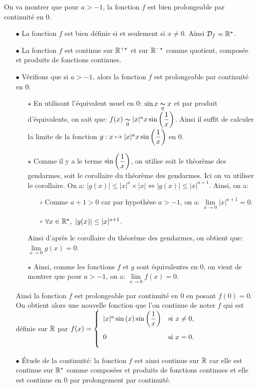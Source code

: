 \documentclass[a4paper, 11pt,reqno]{article}
\begin{document}
\begin{correction}   \;
	On va montrer que pour $a>-1$, la fonction $f$ est bien prolongeable par continuit\'e en 0.
	\begin{itemize}
		\item[$\bullet$] La fonction $f$ est bien d\'efinie si et seulement si $x\not= 0$. Ainsi $\mathcal{D}_f=\mathbb{R}^{\star}$.
		\item[$\bullet$] La fonction $f$ est continue sur $\mathbb{R}^{+\star}$ et sur $\mathbb{R}^{-\star}$ comme quotient, compos\'ee et produits de fonctions continues.
		\item[$\bullet$] V\'erifions que si $a>-1$, alors la fonction $f$ est prolongeable par continuit\'e en 0:
		      \begin{itemize}
			      \item[$\star$] En utilisant l'\'equivalent usuel en 0: $\sin{x}\underset{0}{\thicksim}x$ et par produit d'\'equivalents, on sait que: $f(x)\underset{0}{\thicksim} |x|^{a} x\sin{\left( \displaystyle\frac{1}{x}\right)}$. Ainsi il suffit de calculer la limite de la fonction $g: x\mapsto |x|^{a} x\sin{\left( \displaystyle\frac{1}{x}\right)}$ en 0.
			      \item[$\star$] Comme il y a le terme $\sin{\left( \displaystyle\frac{1}{x}\right)}$, on utilise soit le th\'eor\`{e}me des gendarmes, soit le corollaire du th\'eor\`{e}me des gendarmes. Ici on va utiliser le corollaire. On a:
			            $\left| g(x) \right|\leq |x|^{a}\times |x|\Leftrightarrow \left| g(x) \right|\leq |x|^{a+1}$. Ainsi, on a:
			            \begin{itemize}
				            \item[$\circ$] Comme $a+1>0$ car par hypoth\`{e}se $a>-1$, on a: $\lim\limits_{x\to 0} |x|^{a+1}=0$.
				            \item[$\circ$] $\forall x\in\mathbb{R}^{\star},\ \left| g(x) \right|\leq |x|^{a+1}$.
			            \end{itemize}
			            Ainsi d'apr\`{e}s le corollaire du th\'eor\`{e}me des gendarmes, on obtient que: $\lim\limits_{x\to 0} g(x)=0$.
			      \item[$\star$] Ainsi, comme les fonctions $f$ et $g$ sont \'equivalentes en 0, on vient de montrer que pour $a>-1$, on a: $\lim\limits_{x\to 0} f(x)=0$.
		      \end{itemize}
		      Ainsi la fonction $f$ est prolongeable par continuit\'e en 0 en posant $f(0)=0$. On obtient alors une nouvelle fonction que l'on continue de noter $f$ qui est d\'efinie sur $\mathbb{R}$ par
		      $f(x)=\left\lbrace \begin{array}{ll} |x|^{a} \sin{(x)}\sin{\left( \ddp\frac{1}{x}\right)} & \hbox{si}\ x\not= 0,\vsec\\ 0 & \hbox{si}\ x=0.\vsec \end{array}\right.$
		\item[$\bullet$] \'Etude de la continuit\'e: la fonction $f$ est ainsi continue sur $\mathbb{R}$ car elle est continue sur $\mathbb{R}^{\star}$ comme compos\'ees et produits de fonctions continues et elle est continue en 0 par prolongement par continuit\'e.
	\end{itemize}
\end{correction}
\end{document}
